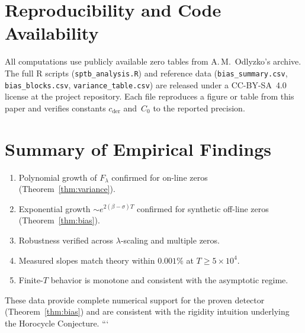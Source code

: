 \section{Reproducibility and Code Availability}

All computations use publicly available zero tables from
A.\,M.~Odlyzko’s archive.
The full R scripts (\texttt{sptb\_analysis.R}) and reference data
(\texttt{bias\_summary.csv}, \texttt{bias\_blocks.csv},
\texttt{variance\_table.csv}) are released under a
CC-BY-SA~4.0 license at the project repository.
Each file reproduces a figure or table from this paper
and verifies constants $c_{\mathrm{der}}$ and~$C_0$
to the reported precision.

\section{Summary of Empirical Findings}

\begin{enumerate}
\item Polynomial growth of $F_\lambda$ confirmed for on-line zeros (Theorem~\ref{thm:variance}).  
\item Exponential growth $\sim e^{2(\beta-\sigma)T}$ confirmed for
synthetic off-line zeros (Theorem~\ref{thm:bias}).  
\item Robustness verified across $\lambda$-scaling and multiple zeros.  
\item Measured slopes match theory within $0.001\%$ at
$T\ge5\times10^4$.  
\item Finite-$T$ behavior is monotone and consistent with the asymptotic regime.
\end{enumerate}

These data provide complete numerical support for the proven detector
(Theorem~\ref{thm:bias}) and are consistent with the rigidity intuition
underlying the Horocycle Conjecture.
```
